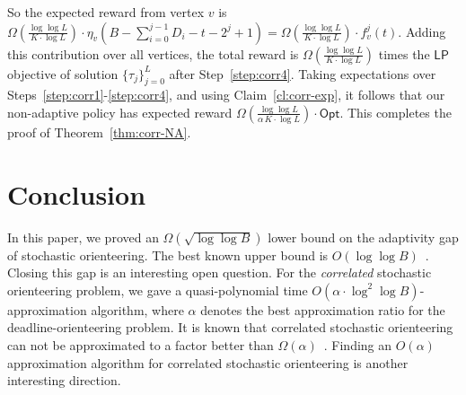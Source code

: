 \documentclass[11pt,letterpaper]{article}
\numberwithin{algorithm}{section}
\newcommand{\Opt}{\ensuremath{\mathsf{Opt}}\xspace}
\newcommand{\lp}{\ensuremath{\mathsf{LP}}\xspace}
\begin{document}
So the expected reward from vertex $v$ is $\Omega\left(\frac{\log\log L}{K\cdot \log L}\right)\cdot \eta_v(B-\sum_{i=0}^{j-1}D_i - t- 2^j+1) = \Omega\left(\frac{\log\log L}{K\cdot \log L}\right)\cdot f^j_v(t)$.
Adding this contribution over all vertices, the total reward is $\Omega\left(\frac{\log\log L}{K\cdot \log L}\right)$ times the \lp objective of solution $\{\tau_j\}_{j=0}^L$ after Step~\ref{step:corr4}. Taking expectations over Steps~\ref{step:corr1}-\ref{step:corr4}, and using Claim~\ref{cl:corr-exp}, it follows that our non-adaptive policy has expected reward $\Omega\left(\frac{\log\log L}{\alpha\, K\cdot \log L}\right)\cdot \Opt$. This completes the proof of Theorem~\ref{thm:corr-NA}.


\section{Conclusion}
In this paper, we proved an $\Omega(\sqrt{\log\log B})$ lower bound on the adaptivity gap of stochastic orienteering. The best known upper bound  is $O(\log\log B)$~\cite{GKNR12}. Closing this gap is an interesting open question. For the {\em correlated} stochastic orienteering problem, we gave a quasi-polynomial time $O(\alpha\cdot \log^2\log B)$-approximation algorithm, where $\alpha$ denotes the best approximation ratio for the deadline-orienteering problem. It is known that correlated stochastic orienteering can not be approximated to a factor better than $\Omega(\alpha)$~\cite{GKNR12}. Finding an $O(\alpha)$ approximation algorithm for correlated stochastic orienteering is another interesting direction.




\end{document}
